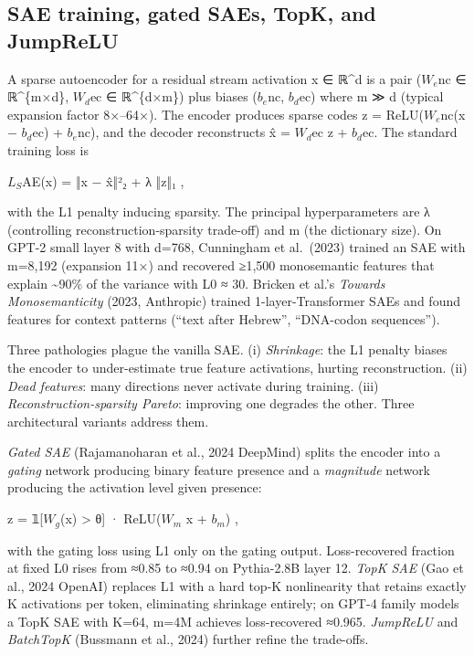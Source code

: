 \documentclass{article}
\begin{document}
\subsection{SAE training, gated SAEs, TopK, and JumpReLU}\label{sae-training-gated-saes-topk-and-jumprelu}

A sparse autoencoder for a residual stream activation x ∈ ℝ\^{}d is a pair (\(W_e\)nc ∈ ℝ\^{}\{m×d\}, \(W_d\)ec ∈ ℝ\^{}\{d×m\}) plus biases (\(b_e\)nc, \(b_d\)ec) where m ≫ d (typical expansion factor 8×--64×). The encoder produces sparse codes z = ReLU(\(W_e\)nc(x − \(b_d\)ec) + \(b_e\)nc), and the decoder reconstructs x̂ = \(W_d\)ec z + \(b_d\)ec. The standard training loss is

\(L_S\)AE(x) = ‖x − x̂‖²₂ + λ ‖z‖₁ ,

with the L1 penalty inducing sparsity. The principal hyperparameters are λ (controlling reconstruction-sparsity trade-off) and m (the dictionary size). On GPT-2 small layer 8 with d=768, Cunningham et al.~(2023) trained an SAE with m=8,192 (expansion 11×) and recovered ≥1,500 monosemantic features that explain \textasciitilde90\% of the variance with L0 ≈ 30. Bricken et al.'s \emph{Towards Monosemanticity} (2023, Anthropic) trained 1-layer-Transformer SAEs and found features for context patterns (``text after Hebrew'', ``DNA-codon sequences'').

Three pathologies plague the vanilla SAE. (i) \emph{Shrinkage}: the L1 penalty biases the encoder to under-estimate true feature activations, hurting reconstruction. (ii) \emph{Dead features}: many directions never activate during training. (iii) \emph{Reconstruction-sparsity Pareto}: improving one degrades the other. Three architectural variants address them.

\emph{Gated SAE} (Rajamanoharan et al., 2024 DeepMind) splits the encoder into a \emph{gating} network producing binary feature presence and a \emph{magnitude} network producing the activation level given presence:

z = 𝟙{[}\(W_g\)(x) \textgreater{} θ{]} · ReLU(\(W_m\) x + \(b_m\)) ,

with the gating loss using L1 only on the gating output. Loss-recovered fraction at fixed L0 rises from ≈0.85 to ≈0.94 on Pythia-2.8B layer 12. \emph{TopK SAE} (Gao et al., 2024 OpenAI) replaces L1 with a hard top-K nonlinearity that retains exactly K activations per token, eliminating shrinkage entirely; on GPT-4 family models a TopK SAE with K=64, m=4M achieves loss-recovered ≈0.965. \emph{JumpReLU} \citep{rajamanoharan2024improvingdictionar} and \emph{BatchTopK} (Bussmann et al., 2024) further refine the trade-offs.
\end{document}
